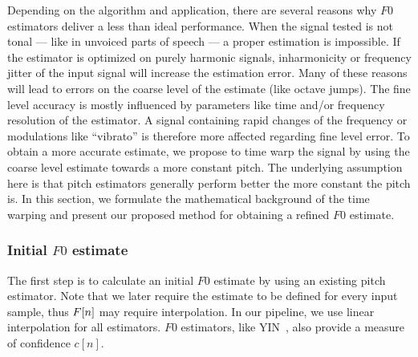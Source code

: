 Depending on the algorithm and application, there are several reasons why $F0$ estimators deliver a less than ideal performance. When the signal tested is not tonal --- like in unvoiced parts of speech --- a proper estimation is impossible. If the estimator is optimized on purely harmonic signals, inharmonicity or frequency jitter of the input signal will increase the estimation error. Many of these reasons will lead to errors on the coarse level of the estimate (like octave jumps). The fine level accuracy is mostly influenced by parameters like time and/or frequency resolution of the estimator. A signal containing rapid changes of the frequency or modulations like ``vibrato'' is therefore more affected regarding fine level error. To obtain a more accurate estimate, we propose to time warp the signal by using the coarse level estimate towards a more constant pitch. The underlying assumption here is that pitch estimators generally perform better the more constant the pitch is.
In this section, we formulate the mathematical background of the time warping and present our proposed method for obtaining a refined $F0$ estimate.

\subsubsection{Initial $F0$ estimate}
\label{ssub:initial_estimate}

The first step is to calculate an initial $F0$ estimate by using an existing pitch estimator. Note that we later require the estimate to be defined for every input sample, thus ${F}[n]$ may require interpolation. In our pipeline, we use linear interpolation for all estimators. $F0$ estimators, like YIN~\cite{decheveigne02}, also provide a measure of confidence $c[n]$.
\par
%
%

